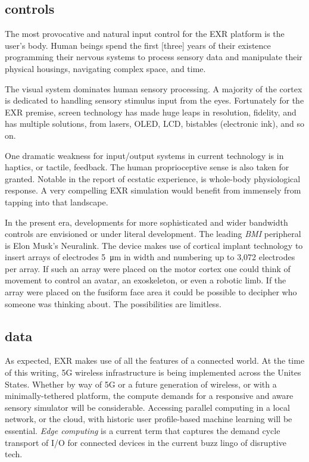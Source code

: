 \documentclass{UIdahoMastersThesis}
\begin{document}
\subsection{controls}

The most provocative and natural input control for the EXR platform is the user's body. Human beings spend the first [three] years of their existence programming their nervous systems to process sensory data and manipulate their physical housings, navigating complex space, and time. 

The visual system dominates human sensory processing. A majority of the cortex is dedicated to handling sensory stimulus input from the eyes. Fortunately for the EXR premise, screen technology has made huge leaps in resolution, fidelity, and has multiple solutions, from lasers, OLED, LCD, bistables (electronic ink), and so on.

One dramatic weakness for input/output systems in current technology is in haptics, or tactile, feedback. The human proprioceptive sense is also taken for granted. Notable in the report of ecstatic experience, is whole-body physiological response. A very compelling EXR simulation would benefit from immensely from tapping into that landscape. 

In the present era, developments for more sophisticated and wider bandwidth controls are envisioned or under literal development. The leading \textit{\ac{BMI}} peripheral is Elon Musk's Neuralink. The device makes use of cortical implant technology to insert arrays of electrodes \SI{5}{\micro\meter} in width and numbering up to 3,072 electrodes per array. If such an array were placed on the motor cortex one could think of movement to control an avatar, an exoskeleton, or even a robotic limb. If the array were placed on the fusiform face area it could be possible to decipher who someone was thinking about. The possibilities are limitless.


\subsection{data}

As expected, EXR makes use of all the features of a connected world. At the time of this writing, 5G wireless infrastructure is being implemented across the Unites States. Whether by way of 5G or a future generation of wireless, or with a minimally-tethered platform, the compute demands for a responsive and aware sensory simulator will be considerable. Accessing parallel computing in a local network, or the cloud, with historic user profile-based machine learning will be essential. \emph{Edge computing }is a current term that captures the demand cycle transport of I/O for connected devices in the current buzz lingo of disruptive tech.
\end{document}
